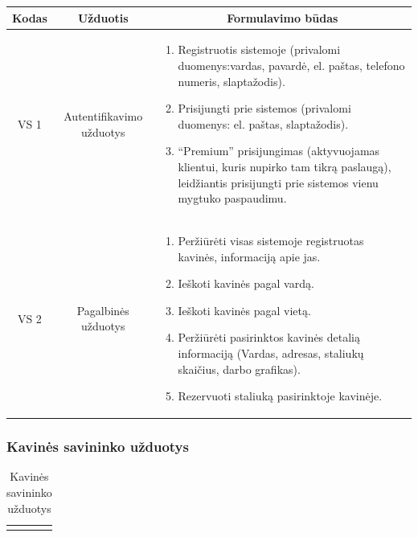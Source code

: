 \documentclass{VUMIFPSkursinis}
\begin{document}
{{{{{\begin{center}
\begin{table}[H]
\begin{tabular}{|p{2cm}|p{}|p{}|}
	\hline
		\multicolumn{1}{|c|}{{\bfseries Kodas}}&
		\multicolumn{1}{|c|}{{\bfseries Užduotis}}&
		\multicolumn{1}{|c|}{{\bfseries Formulavimo būdas}}\\		
	\hline
		\multicolumn{1}{|c|}{VS 1}& 	
		\multicolumn{1}{|c|}{Autentifikavimo užduotys}&
		{
			\begin{enumerate}
				\item Registruotis sistemoje
				(privalomi duomenys:vardas, pavardė, el. paštas, telefono numeris, slaptažodis).
				\item Prisijungti prie sistemos (privalomi duomenys: el. paštas, slaptažodis).
				\item “Premium” prisijungimas (aktyvuojamas klientui, kuris nupirko tam tikrą paslaugą), leidžiantis prisijungti prie sistemos vienu mygtuko paspaudimu.
			\end{enumerate}}\\
	
	\hline
		\multicolumn{1}{|c|}{VS 2}&  	
		\multicolumn{1}{|c|}{Pagalbinės užduotys}&
		{
			\begin{enumerate}
				\item Peržiūrėti visas sistemoje registruotas kavinės, informaciją apie jas.
				\item Ieškoti kavinės pagal vardą.
				\item Ieškoti kavinės pagal vietą.
				\item Peržiūrėti pasirinktos kavinės detalią informaciją (Vardas, adresas, staliukų skaičius, darbo grafikas).
				\item Rezervuoti staliuką pasirinktoje kavinėje.
			\end{enumerate}}\\
	
	\hline 	 	
	\end{tabular}

	\label{table:1}
	\end{table}

\end{center}

\subsubsection{Kavinės savininko užduotys}
\begin{center}
	\begin{table}[H]
	\caption{Kavinės savininko užduotys}
	\begin{tabular}{|p{2cm}|p{}|p{}|}
	\hline
	    \rowcolor{lightgray}
		\multicolumn{3}{|c|}{Kavinės savininko užduotys}\\
		

\end{tabular}
\end{table}
\end{center}}}}}}
\end{document}
